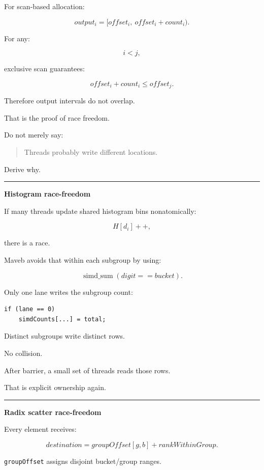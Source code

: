 For scan-based allocation:

\[
output_i
=
[offset_i,\ offset_i+count_i).
\]

For any:

\[
i<j,
\]

exclusive scan guarantees:

\[
offset_i+count_i
\le
offset_j.
\]

Therefore output intervals do not overlap.

That is the proof of race freedom.

Do not merely say:

\begin{quote}
Threads probably write different locations.
\end{quote}

Derive why.

\begin{center}\rule{0.5\linewidth}{0.5pt}\end{center}

\textbf{Histogram race-freedom}

If many threads update shared histogram bins nonatomically:

\[
H[d_i]++,
\]

there is a race.

Maveb avoids that within each subgroup by using:

\[
\operatorname{simd\_sum}(digit==bucket).
\]

Only one lane writes the subgroup count:

\protect{}\label{yjtusl}%
\begin{verbatim}
if (lane == 0)
    simdCounts[...] = total;
\end{verbatim}

Distinct subgroups write distinct rows.

No collision.

After barrier, a small set of threads reads those rows.

That is explicit ownership again.

\begin{center}\rule{0.5\linewidth}{0.5pt}\end{center}

\textbf{Radix scatter race-freedom}

Every element receives:

\[
destination=
groupOffset[g,b]
+
rankWithinGroup.
\]

\texttt{groupOffset} assigns disjoint bucket/group ranges.

